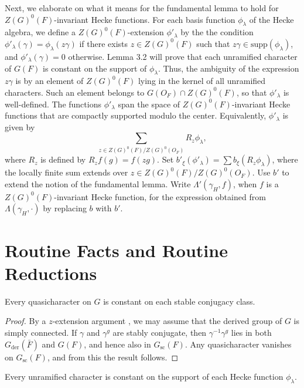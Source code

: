 \documentclass{amsart}
\newenvironment{cthm}[1]
  {\renewcommand\thethm{\sc #1}\thm}
  {\endthm}
\newcommand\s{{\text{sc}}}
\newcommand\der{{\text{der}}}
\begin{document}
Next, we elaborate on
what it means for the fundamental lemma to hold for $Z(G)^0(F)$-invariant
Hecke functions.
For each basis function $\phi_\lambda$ of the Hecke algebra, we
define a $Z(G)^0(F)$-extension $\phi'_\lambda$ by the the condition
$\phi'_\lambda(\gamma) = \phi_\lambda(z\gamma)$ if there
exists $z\in Z(G)^0(F)$ such that
$z\gamma\in \text{supp}(\phi_\lambda)$, and $\phi'_\lambda(\gamma) = 0$
otherwise.  Lemma 3.2 will prove that each unramified character
of $G(F)$
is constant on the support of $\phi_\lambda$.  Thus, the
ambiguity of the expression $z\gamma$ is by an element of $Z(G)^0(F)$
lying in the kernel of all unramified characters.  Such an
element belongs to $G(O_F) \cap Z(G)^0(F)$, so that $\phi'_\lambda$
is well-defined.   
The functions $\phi'_\lambda$ span the space of $Z(G)^0(F)$-invariant
Hecke functions that are compactly supported modulo the center. 
Equivalently, $\phi'_\lambda$ is given by
$$\sum_{z\in Z(G)^0(F)/Z(G)^0(O_F)} R_z\phi_\lambda,$$
where $R_z$ is defined by $R_zf(g) = f(zg)$.
Set $b'_\xi(\phi'_\lambda) = \sum b_\xi(R_z\phi_\lambda)$,
where the locally finite sum extends over $z\in Z(G)^0(F)/Z(G)^0(O_F)$.  
Use $b'$ to extend the notion
of the fundamental lemma.  
Write $\Lambda'(\gamma_H,f)$, when $f$ is
 a $Z(G)^0(F)$-invariant Hecke function, for the expression obtained
 from $\Lambda(\gamma_H,\cdot)$
 by replacing  $b$ with $b'$.


\section{Routine Facts and Routine Reductions }%


\begin{cthm}{Lemma 3.1}  Every quasicharacter
on $G$ is constant on each stable conjugacy
class.
\end{cthm}

\begin{proof}  By a $z$-extension argument \cite{Ko1,3.1.2},
we may assume that the derived group of $G$ is simply connected.
If $\gamma$ and $\gamma^g$ are stably conjugate, then
$\gamma^{-1}\gamma^g$ lies in both $G_{\der}(\bar F)$ and
$G(F)$, and hence also in $G_{\s}(F)$.  Any quasicharacter
vanishes on $G_{\s}(F)$, and from this the result follows.\end{proof}


\begin{cthm}{Lemma 3.2}
Every unramified character is constant on the support
of each Hecke function $\phi_\lambda$.
\end{cthm}
\end{document}

